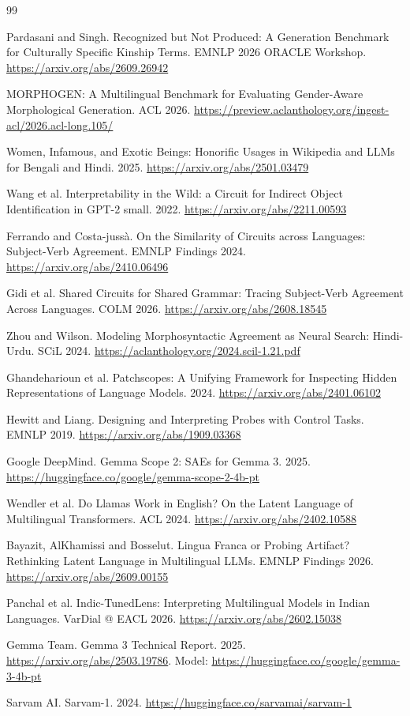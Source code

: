 \documentclass[11pt,a4paper]{article}
\begin{document}
\begin{thebibliography}{99}
\small
\setlength{\itemsep}{0.15em}

 Pardasani and Singh. Recognized but Not Produced: A Generation Benchmark for Culturally Specific Kinship Terms. EMNLP 2026 ORACLE Workshop. \url{https://arxiv.org/abs/2609.26942}

 MORPHOGEN: A Multilingual Benchmark for Evaluating Gender-Aware Morphological Generation. ACL 2026. \url{https://preview.aclanthology.org/ingest-acl/2026.acl-long.105/}

 Women, Infamous, and Exotic Beings: Honorific Usages in Wikipedia and LLMs for Bengali and Hindi. 2025. \url{https://arxiv.org/abs/2501.03479}

 Wang et al. Interpretability in the Wild: a Circuit for Indirect Object Identification in GPT-2 small. 2022. \url{https://arxiv.org/abs/2211.00593}

 Ferrando and Costa-juss\`a. On the Similarity of Circuits across Languages: Subject-Verb Agreement. EMNLP Findings 2024. \url{https://arxiv.org/abs/2410.06496}

 Gidi et al. Shared Circuits for Shared Grammar: Tracing Subject-Verb Agreement Across Languages. COLM 2026. \url{https://arxiv.org/abs/2608.18545}

 Zhou and Wilson. Modeling Morphosyntactic Agreement as Neural Search: Hindi-Urdu. SCiL 2024. \url{https://aclanthology.org/2024.scil-1.21.pdf}

 Ghandeharioun et al. Patchscopes: A Unifying Framework for Inspecting Hidden Representations of Language Models. 2024. \url{https://arxiv.org/abs/2401.06102}

 Hewitt and Liang. Designing and Interpreting Probes with Control Tasks. EMNLP 2019. \url{https://arxiv.org/abs/1909.03368}

 Google DeepMind. Gemma Scope 2: SAEs for Gemma 3. 2025. \url{https://huggingface.co/google/gemma-scope-2-4b-pt}

 Wendler et al. Do Llamas Work in English? On the Latent Language of Multilingual Transformers. ACL 2024. \url{https://arxiv.org/abs/2402.10588}

 Bayazit, AlKhamissi and Bosselut. Lingua Franca or Probing Artifact? Rethinking Latent Language in Multilingual LLMs. EMNLP Findings 2026. \url{https://arxiv.org/abs/2609.00155}

 Panchal et al. Indic-TunedLens: Interpreting Multilingual Models in Indian Languages. VarDial @ EACL 2026. \url{https://arxiv.org/abs/2602.15038}

 Gemma Team. Gemma 3 Technical Report. 2025. \url{https://arxiv.org/abs/2503.19786}. Model: \url{https://huggingface.co/google/gemma-3-4b-pt}

 Sarvam AI. Sarvam-1. 2024. \url{https://huggingface.co/sarvamai/sarvam-1}

\end{thebibliography}
\end{document}
